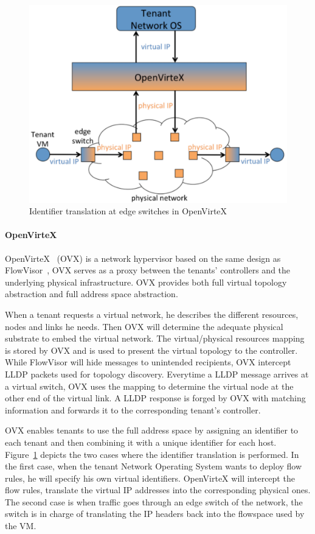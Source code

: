 \begin{figure}[ht]
    \centering
    \includegraphics[scale=0.7]{figures/openvirtex.pdf}
    \caption{Identifier translation at edge switches in OpenVirteX~\cite{OpenVirteX-Al-Shabibi2014}}
    \label{fig:openvirtex}
\end{figure}

\paragraph{OpenVirteX}
OpenVirteX~\cite{OpenVirteX-Al-Shabibi2014} (OVX) is a network hypervisor based on the same design as FlowVisor~\cite{FlowVisor-Sherwood2009}, \ie OVX serves as a proxy between the tenants' controllers and the underlying physical infrastructure. OVX provides both full virtual topology abstraction and full address space abstraction. 

When a tenant requests a virtual network, he describes the different resources, nodes and links he needs.
Then OVX will determine the adequate physical substrate to embed the virtual network.
The virtual/physical resources mapping is stored by OVX and is used to present the virtual topology to the controller.
While FlowVisor will hide messages to unintended recipients, OVX intercept LLDP packets used for topology discovery. Everytime a LLDP message arrives at a virtual switch, OVX uses the mapping to determine the virtual node at the other end of the virtual link. A LLDP response is forged by OVX with matching information and forwards it to the corresponding tenant's controller.

OVX enables tenants to use the full address space by assigning an identifier to each tenant and then combining it with a unique identifier for each host. Figure~\ref{fig:openvirtex} depicts the two cases where the identifier translation is performed. In the first case, when the tenant Network Operating System wants to deploy flow rules, he will specify his own virtual identifiers. OpenVirteX will intercept the flow rules, translate the virtual IP addresses into the corresponding physical ones. The second case is when traffic goes through an edge switch of the network, the switch is in charge of translating the IP headers back into the flowspace used by the VM.

